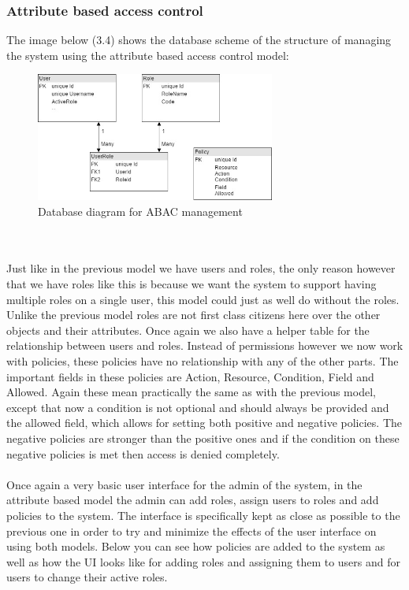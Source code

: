 \subsubsection{Attribute based access control}
The image below (3.4) shows the database scheme of the structure of managing the system using the attribute based access control model:
\begin{figure}[h]
    \centering
    \includegraphics[width=0.7\textwidth]{Img/self/ABACManagementDiagram.jpg}
    \caption{Database diagram for ABAC management}
\end{figure}
\\
\\
Just like in the previous model we have users and roles, the only reason however that we have roles like this is because we want the system to support having multiple roles on a single user, this model could just as well do without the roles.
Unlike the previous model roles are not first class citizens here over the other objects and their attributes.
Once again we also have a helper table for the relationship between users and roles.
Instead of permissions however we now work with policies, these policies have no relationship with any of the other parts.
The important fields in these policies are Action, Resource, Condition, Field and Allowed. 
Again these mean practically the same as with the previous model, except that now a condition is not optional and should always be provided and the allowed field, which allows for setting both positive and negative policies.
The negative policies are stronger than the positive ones and if the condition on these negative policies is met then access is denied completely.
\\
\\
Once again a very basic user interface for the admin of the system, in the attribute based model the admin can add roles, assign users to roles and add policies to the system.
The interface is specifically kept as close as possible to the previous one in order to try and minimize the effects of the user interface on using both models.
Below you can see how policies are added to the system as well as how the UI looks like for adding roles and assigning them to users and for users to change their active roles.

